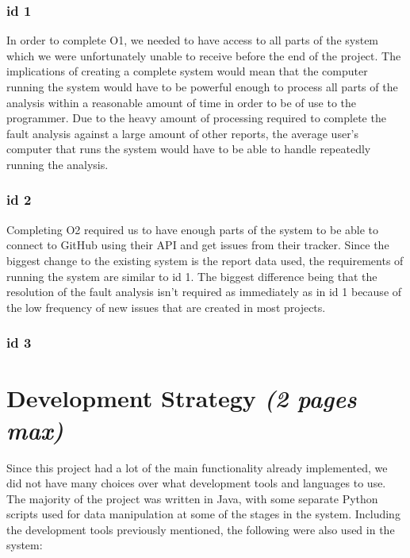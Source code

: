 \documentclass[12pt]{article}
\begin{document}
\hypertarget{id-1}{%
\subsubsection{id 1}\label{id-1}}

In order to complete O1, we needed to have access to all parts of the
system which we were unfortunately unable to receive before the end of
the project. The implications of creating a complete system would mean
that the computer running the system would have to be powerful enough to
process all parts of the analysis within a reasonable amount of time in
order to be of use to the programmer. Due to the heavy amount of
processing required to complete the fault analysis against a large
amount of other reports, the average user's computer that runs the
system would have to be able to handle repeatedly running the analysis.

\hypertarget{id-2}{%
\subsubsection{id 2}\label{id-2}}

Completing O2 required us to have enough parts of the system to be able
to connect to GitHub using their API and get issues from their tracker.
Since the biggest change to the existing system is the report data used,
the requirements of running the system are similar to id 1. The biggest
difference being that the resolution of the fault analysis isn't
required as immediately as in id 1 because of the low frequency of new
issues that are created in most projects.

\hypertarget{id-3}{%
\subsubsection{id 3}\label{id-3}}

\hypertarget{development-strategy-2-pages-max}{%
\section{\texorpdfstring{Development Strategy \emph{(2 pages
max)}}{Development Strategy (2 pages max)}}\label{development-strategy-2-pages-max}}

Since this project had a lot of the main functionality already
implemented, we did not have many choices over what development tools
and languages to use. The majority of the project was written in Java,
with some separate Python scripts used for data manipulation at some of
the stages in the system. Including the development tools previously
mentioned, the following were also used in the system:
\end{document}
